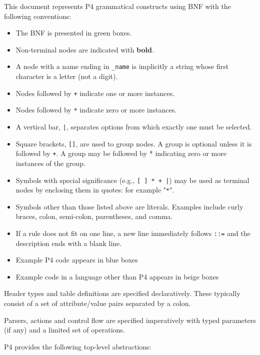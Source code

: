 \documentclass[12pt]{article}
\begin{document}

This document represents P4 grammatical constructs using BNF with the
following conventions:

\begin{itemize}
\item
The BNF is presented in green boxes.
\item
Non-terminal nodes are indicated with \textbf{bold}.
\item
A node with a name ending in \texttt{_name} is implicitly a string whose first character 
is a letter (not a digit).
\item
Nodes followed by \texttt{+} indicate one or more instances.
\item
Nodes followed by \texttt{*} indicate zero or more instances.
\item
A vertical bar, \texttt{|}, separates options from which exactly one must be selected.
\item
Square brackets, \texttt{[]}, are used to group nodes. A group is optional unless 
it is followed by \texttt{+}. A group may be followed by * indicating zero or more 
instances of the group.
\item
Symbols with special significance (e.g., \texttt{[ ] * + |}) may be used as terminal 
nodes by enclosing them in quotes: for example "\texttt{*}".
\item
Symbols other than those listed above are literals. Examples include curly 
braces, colon, semi-colon, parentheses, and comma.
\item
If a rule does not fit on one line, a new line immediately follows \texttt{::=} and 
the description ends with a blank line.
\item
Example P4 code appears in blue boxes
\item
Example code in a language other than P4 appears in beige boxes
\end{itemize}

Header types and table definitions are specified declaratively.  These
typically consist of a set of attribute/value pairs separated by a
colon.

Parsers, actions and control flow are specified imperatively with
typed parameters (if any) and a limited set of operations.



P4 provides the following top-level abstractions: 
\end{document}
